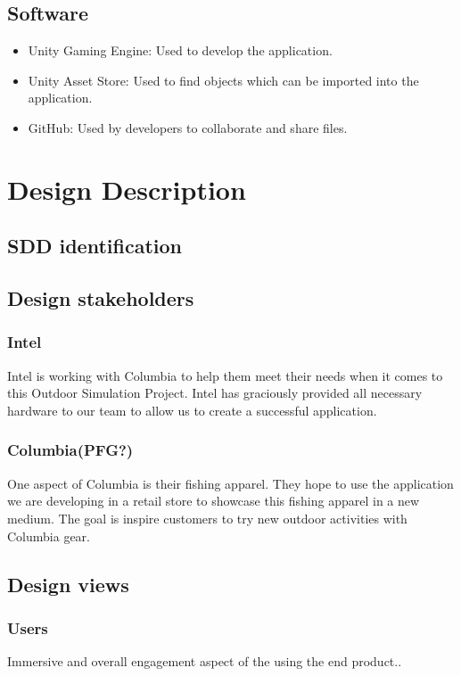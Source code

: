 \documentclass[10pt,journal,compsoc,onecolumn, draftclsnofoot]{IEEEtran}
\begin{document}
\subsection{Software}
\begin{itemize}
  \item Unity Gaming Engine: Used to develop the application.
  \item Unity Asset Store: Used to find objects which can be imported into the application.
  \item GitHub: Used by developers to collaborate and share files.
\end{itemize}


\section{Design Description}
\subsection{SDD identification}
\subsection{Design stakeholders}
\subsubsection{Intel}
Intel is working with Columbia to help them meet their needs when it comes to this Outdoor Simulation Project. Intel has graciously provided all necessary hardware to our team to allow us to create a successful application.

\subsubsection{Columbia(PFG?)}
One aspect of Columbia is their fishing apparel. They hope to use the application we are developing in a retail store to showcase this fishing apparel in a new medium. The goal is inspire customers to try new outdoor activities with Columbia gear.

\subsection{Design views}
\subsubsection{Users}
Immersive and overall engagement aspect of the using the end product..
\end{document}
